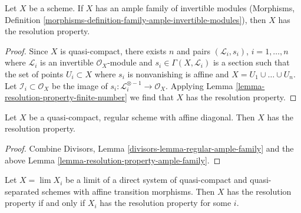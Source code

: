 \begin{lemma}
\label{lemma-resolution-property-ample-family}
Let $X$ be a scheme. If $X$ has an ample family of invertible modules
(Morphisms, Definition
\ref{morphisms-definition-family-ample-invertible-modules}),
then $X$ has the resolution property.
\end{lemma}

\begin{proof}
Since $X$ is quasi-compact, there exists $n$ and pairs
$(\mathcal{L}_i, s_i)$, $i = 1, \ldots, n$ where
$\mathcal{L}_i$ is an invertible $\mathcal{O}_X$-module and
$s_i \in \Gamma(X, \mathcal{L}_i)$ is a section
such that the set of points $U_i \subset X$ where $s_i$ is nonvanishing
is affine and $X = U_1 \cup \ldots \cup U_n$.
Let $\mathcal{I}_i \subset \mathcal{O}_X$ be the image
of $s_i : \mathcal{L}_i^{\otimes -1} \to \mathcal{O}_X$.
Applying Lemma \ref{lemma-resolution-property-finite-number}
we find that $X$ has the resolution property.
\end{proof}

\begin{lemma}
\label{lemma-regular-resolution-property}
Let $X$ be a quasi-compact, regular scheme with affine diagonal.
Then $X$ has the resolution property.
\end{lemma}

\begin{proof}
Combine Divisors, Lemma \ref{divisors-lemma-regular-ample-family} and the above
Lemma \ref{lemma-resolution-property-ample-family}.
\end{proof}

\begin{lemma}
\label{lemma-resolution-property-descends}
Let $X = \lim X_i$ be a limit of a direct system of quasi-compact
and quasi-separated schemes with affine transition morphisms.
Then $X$ has the resolution property if and only if $X_i$ has
the resolution property for some $i$.
\end{lemma}

